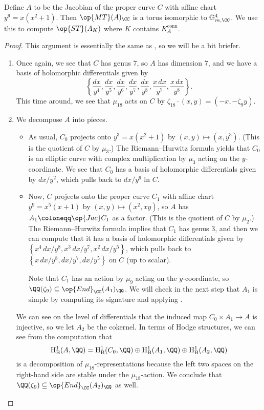 \documentclass[../thesis.tex]{subfiles}
\begin{document}
\begin{proposition} \label{prop:special-fermat-st-2}
	Define $A$ to be the Jacobian of the proper curve $C$ with affine chart $y^9=x\left(x^2+1\right)$. Then $\op{MT}(A)_\CC$ is a torus isomorphic to $\mathbb G_{m,\CC}^4$. We use this to compute $\op{ST}(A_K)$ where $K$ contains $K_A^{\mathrm{conn}}$.
\end{proposition}
\begin{proof}
	This argument is essentially the same as , so we will be a bit briefer.
	\begin{enumerate}
		\item Once again, we see that $C$ has genus $7$, so $A$ has dimension $7$, and we have a basis of holomorphic differentials given by
		\[\left\{\frac{dx}{y^4},\frac{dx}{y^5},\frac{dx}{y^6},\frac{dx}{y^7},\frac{dx}{y^8},\frac{x\,dx}{y^7},\frac{x\,dx}{y^8}\right\}.\]
		This time around, we see that $\mu_{18}$ acts on $C$ by $\zeta_{18}\cdot(x,y)=(-x,-\zeta_9y)$.

		\item We decompose $A$ into pieces.
		\begin{itemize}
			\item As usual, $C_0$ projects onto $y^3=x\left(x^2+1\right)$ by $(x,y)\mapsto\left(x,y^3\right)$. (This is the quotient of $C$ by $\mu_3$.) The Riemann--Hurwitz formula yields that $C_0$ is an elliptic curve with complex multiplication by $\mu_3$ acting on the $y$-coordinate. We see that $C_0$ has a basis of holomorphic differentials given by $dx/y^2$, which pulls back to $dx/y^6$ ln $C$.

			\item Now, $C$ projects onto the proper curve $C_1$ with affine chart $y^9=x^5(x+1)$ by $(x,y)\mapsto\left(x^2,xy\right)$, so $A$ has $A_1\coloneqq\op{Jac}C_1$ as a factor. (This is the quotient of $C$ by $\mu_2$.) The Riemann--Hurwitz formula implies that $C_1$ has genus $3$, and then we can compute that it has a basis of holomorphic differentials given by $\left\{x^4\,dx/y^8,x^3\,dx/y^7,x^2\,dx/y^5\right\}$, which pulls back to $\left\{x\,dx/y^8,dx/y^7,dx/y^5\right\}$ on $C$ (up to scalar).

			Note that $C_1$ has an action by $\mu_9$ acting on the $y$-coordinate, so $\QQ(\zeta_9)\subseteq\op{End}_\CC(A_1)_\QQ$. We will check in the next step that $A_1$ is simple by computing its signature and applying .
		\end{itemize}
		We can see on the level of differentials that the induced map $C_0\times A_1\to A$ is injective, so we let $A_2$ be the cokernel. In terms of Hodge structures, we can see from the computation that
		\[\mathrm H^1_{\mathrm B}(A,\QQ)=\mathrm H^1_{\mathrm B}(C_0,\QQ)\oplus\mathrm H^1_{\mathrm B}(A_1,\QQ)\oplus\mathrm H^1_{\mathrm B}(A_2,\QQ)\]
		is a decomposition of $\mu_{18}$-representations because the left two spaces on the right-hand side are stable under the $\mu_{18}$-action. We conclude that $\QQ(\zeta_9)\subseteq\op{End}_\CC(A_2)_\QQ$ as well.


\end{enumerate}
\end{proof}
\end{document}

